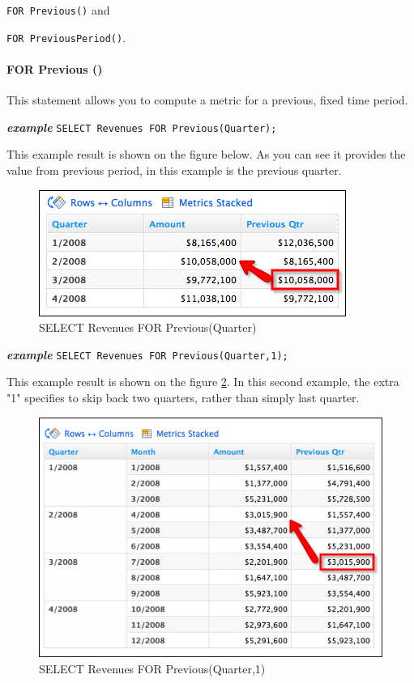 \documentclass[a4paper, 12pt, titlepage, fleqn]{article}
\begin{document}
\hspace{0.9cm}\verb=FOR Previous()= and 

\hspace{0.9cm}\verb=FOR PreviousPeriod()=.

\paragraph*{FOR Previous ()} This statement allows you to compute a metric for a previous, fixed time period.

\textbf{\emph{example}}  \hspace{.9cm}\verb=SELECT Revenues FOR Previous(Quarter);=

\noindent This example result is shown on the figure below. As you can see it provides the value from previous period, in this example is the previous quarter.

\begin{figure}[htb]
\centering
\includegraphics[scale=0.6]{images/rg_prevQtr.png}
\caption{SELECT Revenues FOR Previous(Quarter)}
\label{fig:4pq}
\end{figure}

\textbf{\emph{example}}  \hspace{.9cm}\verb=SELECT Revenues FOR Previous(Quarter,1);=

\noindent This example result is shown on the figure \ref{fig:4pq2}. In this second example, the extra "1" specifies to skip back two quarters, rather than simply last quarter.

\begin{figure}[htb]
\centering
\includegraphics[scale=0.6]{images/rg_prevQtrMonth.png}
\caption{SELECT Revenues FOR Previous(Quarter,1)}
\label{fig:4pq2}
\end{figure}
\end{document}
